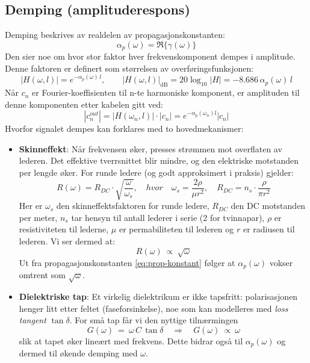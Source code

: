 \subsection{Demping (amplituderespons)}
Demping beskrives av realdelen av propagasjonskonstanten:
\[ 
  \alpha_p(\omega)=\Re\{\gamma(\omega)\}
\]
Den sier noe om hvor stor faktor hver frekvenskomponent dempes i amplitude. Denne faktoren er definert som størrelsen av overføringsfunksjonen:
\[
|H(\omega,l)|=e^{-\alpha_p(\omega)\,l}, \qquad |H(\omega,l)|_{\mathrm{dB}} = 20\log_{10}|H| = -8.686\,\alpha_p(\omega)\,l
\]
Når $c_n$ er Fourier-koeffisienten til n-te harmoniske komponent, er amplituden til denne komponenten etter kabelen gitt ved:
\[
|c_n^{out}| = |H(\omega_n,l)| \cdot |c _n| = e^{-\alpha_p(\omega_n) l} |c_n|
\]
Hvorfor signalet dempes kan forklares med to hovedmekanismer:\\
\begin{itemize}[leftmargin=2.8em,style=nextline]
  \item \textbf{Skinneffekt}: Når frekvensen øker, presses strømmen mot overflaten av lederen. Det effektive tverrsnittet blir mindre, og den elektriske motstanden per lengde øker. For runde ledere (og godt approksimert i praksis) gjelder:
    \begin{equation}
        R(\omega) = R_{DC} \cdot \sqrt{\frac{\omega}{\omega_{s}}}, \quad hvor \quad \omega_{s} = \frac{2 \rho}{ \mu r^2}, \quad R_{DC} = n_s \cdot \frac{\rho}{\pi r^2}
        \label{eq:skin-effekt}
    \end{equation}
    Her er $\omega_{s}$ den skinneffektsfaktoren for runde ledere, $R_{DC}$ den DC motstanden per meter, $n_s$ tar hensyn til antall lederer i serie (2 for tvinnapar), $\rho$ er resistiviteten til lederne, $\mu$ er permabiliteten til lederen og $r$ er radiusen til lederen. Vi ser dermed at:
    \[
    R(\omega)\ \propto\ \sqrt{\omega}
    \]
  Ut fra propagasjonskonstanten \eqref{eq:prop-konstant} følger at $\alpha_p(\omega)$ vokser omtrent som $\sqrt{\omega}$.\\
  \item \textbf{Dielektriske tap}: Et virkelig dielektrikum er ikke tapsfritt: polarisasjonen henger litt etter feltet (faseforsinkelse), noe som kan modelleres med \emph{loss tangent} \(\tan\delta\). For små tap får vi den nyttige tilnærmingen
  \begin{equation}
  G(\omega)\ =\ \omega\,C\,\tan\delta \quad \Rightarrow \quad G(\omega)\ \propto\ \omega
    \label{eq:dielectric_loss}
  \end{equation}
  slik at tapet øker lineært med frekvens. Dette bidrar også til \(\alpha_p(\omega)\) og dermed til økende demping med \(\omega\).\\
\end{itemize}
\clearpage

